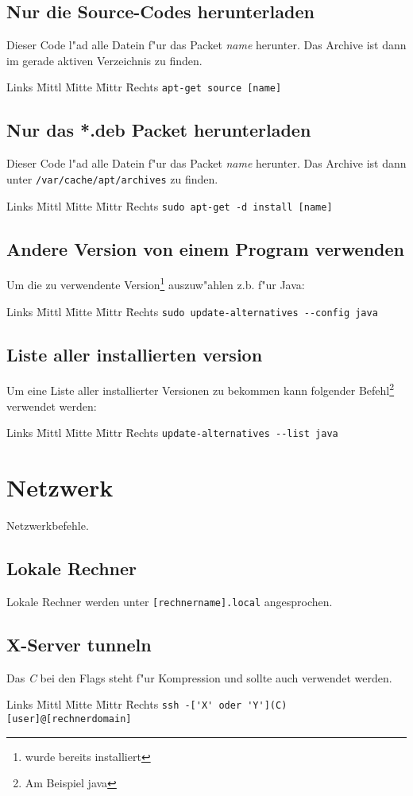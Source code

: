 \documentclass[12pt]{article}
\newenvironment{code}{\begin{tabbing}Links \= Mittl \= Mitte \= Mittr \= Rechts \kill}{\end{tabbing}}
\begin{document}
\subsection{Nur die Source-Codes herunterladen}
Dieser Code l"ad alle Datein f"ur das Packet \textit{name} herunter. Das Archive ist dann 
im gerade aktiven Verzeichnis zu finden.
\begin{code}
	\> \verb#apt-get source [name]#
\end{code}

\subsection{Nur das *.deb Packet herunterladen}
Dieser Code l"ad alle Datein f"ur das Packet \textit{name} herunter. Das Archive ist dann unter 
\verb#/var/cache/apt/archives# zu finden.
\begin{code}
	\> \verb#sudo apt-get -d install [name]#
\end{code}
\subsection{Andere Version von einem Program verwenden}
Um die zu verwendente Version\footnote{wurde bereits installiert} auszuw"ahlen
z.b. f"ur Java:
\begin{code}
	\> \verb#sudo update-alternatives --config java#
\end{code}
\subsection{Liste aller installierten version}
Um eine Liste aller installierter Versionen zu bekommen kann folgender Befehl\footnote{Am Beispiel java}
 verwendet werden:
\begin{code}
	\> \verb#update-alternatives --list java#
\end{code}

\section{Netzwerk}
Netzwerkbefehle.
\subsection{Lokale Rechner}
Lokale Rechner werden unter \verb#[rechnername].local# angesprochen.
\subsection{X-Server tunneln}
Das \textit{C} bei den Flags steht f"ur Kompression und sollte auch verwendet werden.
\begin{code}
	\> \verb#ssh -['X' oder 'Y'](C) [user]@[rechnerdomain]#
\end{code}
\end{document}
